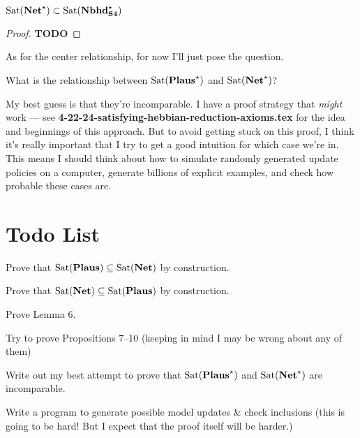 \documentclass[letterpaper]{article}
\begin{document}
\begin{proposition}
    $\mathrm{Sat}( \textrm{\textbf{Net}}^\star ) \subset \mathrm{Sat}( \textrm{\textbf{Nbhd}}_\textrm{\textbf{S4}}^\star )$
\end{proposition}
\begin{proof}
    \textbf{TODO}
\end{proof}

As for the center relationship, for now I'll just pose the question. 
\begin{question}
    What is the relationship between $\mathrm{Sat}( \textrm{\textbf{Plaus}}^\star )$ and $\mathrm{Sat}( \textrm{\textbf{Net}}^\star )$?
\end{question}
My best guess is that they're incomparable.  I have a proof strategy that \emph{might} work --- see \textbf{4-22-24-satisfying-hebbian-reduction-axioms.tex} for the idea and beginnings of this approach.  But to avoid getting stuck on this proof, I think it's really important that I try to get a good intuition for which case we're in.  This means I should think about how to simulate randomly generated update policies on a computer, generate billions of explicit examples, and check how probable these cases are.

\section*{Todo List}
\begin{todolist}
    \item Prove that $\mathrm{Sat}( \textrm{\textbf{Plaus}} ) \subseteq \mathrm{Sat}( \textrm{\textbf{Net}} )$ by construction.
    \item Prove that $\mathrm{Sat}( \textrm{\textbf{Net}} ) \subseteq \mathrm{Sat}( \textrm{\textbf{Plaus}} )$ by construction.
    \item Prove Lemma 6.
    \item Try to prove Propositions 7--10 (keeping in mind I may be wrong about any of them)
    \item Write out my best attempt to prove that $\mathrm{Sat}( \textrm{\textbf{Plaus}}^\star )$ and $\mathrm{Sat}( \textrm{\textbf{Net}}^\star )$ are incomparable.
    \item Write a program to generate possible model updates \& check inclusions (this is going to be hard!  But I expect that the proof itself will be harder.)
\end{todolist}





\printbibliography
\end{document}
